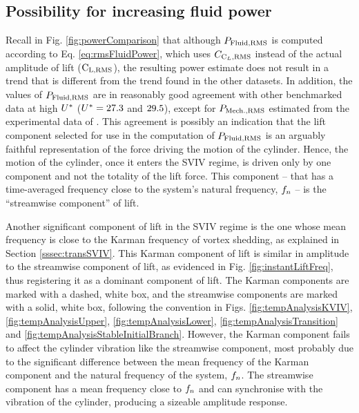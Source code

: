 \documentclass[oneside]{utmthesis}
\begin{document}
\subsection{Possibility for increasing fluid power} \label{ssec:possIncrease}
Recall in Fig. \ref{fig:powerComparison} that although $P_{\text{Fluid,RMS}}$ is computed according to Eq. \ref{eq:rmsFluidPower}, which uses $C_{\text{C}_{L},\text{RMS}}$ instead of the actual \rms{} amplitude of lift ($\text{C}_{\text{L,RMS}}$), the resulting power estimate does not result in a trend that is different from the trend found in the other datasets. In addition, the values of $P_{\text{Fluid,RMS}}$ are in reasonably good agreement with other benchmarked data at high $U^{*}$ ($U^{*} = 27.3$ and $29.5$), except for $P_{\text{Mech.,RMS}}$ estimated from the experimental data of \citet{Nguyen2012}. This agreement is possibly an indication that the lift component selected for use in the computation of $P_{\text{Fluid,RMS}}$ is an arguably faithful representation of the force driving the motion of the cylinder. Hence, the motion of the cylinder, once it enters the SVIV regime, is driven only by one component and not the totality of the lift force. This component -- that has a time-averaged frequency close to the system's natural frequency, $f_{n}$ -- is the ``streamwise component'' of lift.

Another significant component of lift in the SVIV regime is the one whose mean frequency is close to the Karman frequency of vortex shedding, as explained in Section \ref{sssec:transSVIV}. This Karman component of lift is similar in amplitude to the streamwise component of lift, as evidenced in Fig. \ref{fig:instantLiftFreq}, thus registering it as a dominant component of lift. The Karman components are marked with a dashed, white box, and the streamwise components are marked with a solid, white box, following the convention in Figs. \ref{fig:tempAnalysisKVIV}, \ref{fig:tempAnalysisUpper}, \ref{fig:tempAnalysisLower}, \ref{fig:tempAnalysisTransition} and \ref{fig:tempAnalysisStableInitialBranch}. However, the Karman component fails to affect the cylinder vibration like the streamwise component, most probably due to the significant difference between the mean frequency of the Karman component and the natural frequency of the system, $f_{n}$.  The streamwise component has a mean frequency close to $f_{n}$ and can synchronise with the vibration of the cylinder, producing a sizeable amplitude response.
\end{document}
